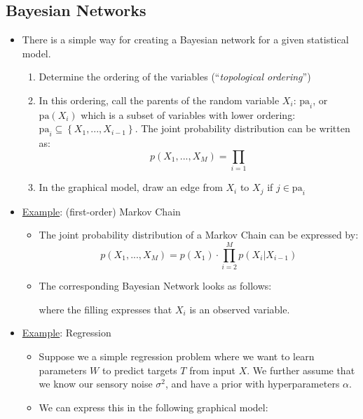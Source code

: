 \subsection{Bayesian Networks}
\begin{itemize}
	\item There is a simple way for creating a Bayesian network for a given statistical model.
	\begin{enumerate}
		\item Determine the ordering of the variables (``\textit{topological ordering}'')
		\item In this ordering, call the parents of the random variable $X_i$: $\text{pa}_i$, or $\text{pa}(X_i)$ which is a subset of variables with lower ordering: $\text{pa}_i \subseteq \left\{X_1,...,X_{i-1}\right\}$. The joint probability distribution can be written as:
		$$p(X_1,...,X_M) = \prod_{i=1}$$
		\item In the graphical model, draw an edge from $X_i$ to $X_j$ if $j\in \text{pa}_i$
	\end{enumerate}
	\item \underline{Example}: (first-order) Markov Chain
	\begin{itemize}
		\item The joint probability distribution of a Markov Chain can be expressed by:
		$$p(X_1,...,X_M)=p(X_1)\cdot \prod_{i=2}^{M} p(X_i|X_{i-1})$$
		\item The corresponding Bayesian Network looks as follows:
		\begin{figure}[ht!]
			\centering
		\end{figure}
		where the filling expresses that $X_i$ is an observed variable.
	\end{itemize}
	\item \underline{Example}: Regression
	\begin{itemize}
		\item Suppose we a simple regression problem where we want to learn parameters $W$ to predict targets $T$ from input $X$. We further assume that we know our sensory noise $\sigma^2$, and have a prior with hyperparameters $\alpha$.
		\item We can express this in the following graphical model:
		\begin{figure}[ht!]
			\centering
\end{figure}
\end{itemize}
\end{itemize}
